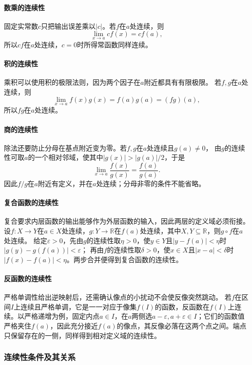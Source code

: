 \paragraph{数乘的连续性}
固定实常数$c$只把输出误差乘以$|c|$。若$f$在$a$处连续，则
\[
 \lim_{x\to a}cf(x)=cf(a),
\]
所以$cf$在$a$处连续，$c=0$时所得常函数同样连续。

\paragraph{积的连续性}
乘积可以使用积的极限法则，因为两个因子在$a$附近都具有有限极限。
若$f,g$在$a$处连续，则
\[
 \lim_{x\to a}f(x)g(x)=f(a)g(a)=(fg)(a),
\]
所以$fg$在$a$处连续。

\paragraph{商的连续性}
除法还要防止分母在基点附近变为零。若$f,g$在$a$处连续且$g(a)\neq0$，
由$g$的连续性可取$a$的一个相对邻域，使其中$|g(x)|>|g(a)|/2$，于是
\[
 \lim_{x\to a}\frac{f(x)}{g(x)}=\frac{f(a)}{g(a)}.
\]
因此$f/g$在$a$附近有定义，并在$a$处连续；分母非零的条件不能省略。

\paragraph{复合函数的连续性}
复合要求内层函数的输出能够作为外层函数的输入，因此两层的定义域必须衔接。
设$f:X\to Y$在$a\in X$处连续，$g:Y\to\mathbb R$在$f(a)$处连续，其中$X,Y\subseteq\mathbb R$，则$g\circ f$在$a$处连续。
给定$\varepsilon>0$，先由$g$的连续性取$\eta>0$，使$y\in Y$且$|y-f(a)|<\eta$时$|g(y)-g(f(a))|<\varepsilon$；
再由$f$的连续性取$\delta>0$，使$x\in X$且$|x-a|<\delta$时$|f(x)-f(a)|<\eta$。两步合并便得到复合函数的连续性。

\paragraph{反函数的连续性}
\label{sec:analysis-inverse-continuity}
严格单调性给出逆映射后，还需确认像点的小扰动不会使反像突然跳动。
若$f$在区间$I$上连续且严格单调，它是一一对应于像集$f(I)$的函数，反函数在$f(I)$上连续。以严格递增为例，固定内点$a\in I$，在$a$两侧选$a-\varepsilon,a+\varepsilon\in I$；它们的函数值严格夹住$f(a)$，因此充分接近$f(a)$的像点，其反像必落在这两个点之间。端点只保留存在的一侧，同样得到相对定义域的连续性。

\subsubsection{连续性条件及其关系}
\label{sec:analysis-continuity-relations}

